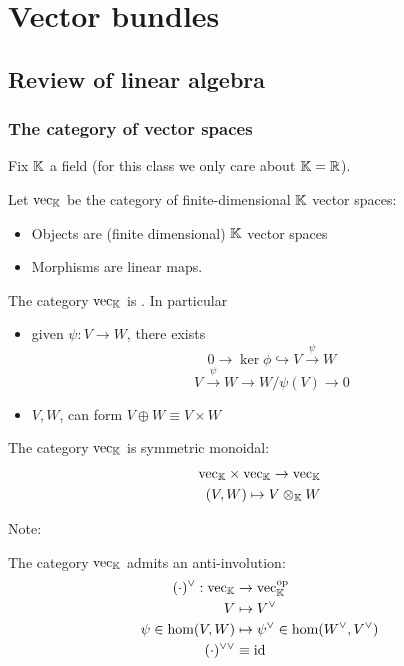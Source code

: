 \chapter{Vector bundles}

\section{Review of linear algebra}

\subsection{The category of vector spaces}

Fix \(\mathbb{K}\) a field (for this class we only care about \(\mathbb{K}=\mathbb{R}\)).

Let \(\text{vec}_{\mathbb{K}}\) be the category of finite-dimensional \(\mathbb{K}\) vector spaces:
\begin{itemize}
    \item Objects are (finite dimensional) \(\mathbb{K}\) vector spaces 
    \item Morphisms are linear maps.
\end{itemize}

The category \(\text{vec}_{\mathbb{K}}\) is . In particular 
\begin{itemize}
    \item given \(\psi:V\to W\), there exists \[0\to \ker \phi \hookrightarrow V\stackrel{\psi}{\to} W\]
         \[V\stackrel{\psi}{\to} W\to W/\psi(V)\to 0\] %
    \item \(V,W\), can form \(V\oplus W \equiv V\times W\) 
\end{itemize}

The category \(\text{vec}_{\mathbb{K}}\) is symmetric monoidal:
\begin{align*}
    \text{vec}_{\mathbb{K}} \times \text{vec}_{\mathbb{K}} \to \text{vec}_{\mathbb{K}}\\
    (V,W)\mapsto V \otimes_{\mathbb{K}} W
\end{align*}

Note: %

The category \(\text{vec}_{\mathbb{K}}\) admits an anti-involution:
\begin{align*}
    (\cdot)^{\vee}:\text{vec}_{\mathbb{K}}&\to \text{vec}_{\mathbb{K}}^{\text{op}}\\
    V&\mapsto V^\vee \\
    \psi\in\text{hom}(V,W)&\mapsto \psi^\vee \in \text{hom}(W^\vee,V^\vee) \\
    (\cdot)^{\vee\vee} & \equiv \text{id}
\end{align*}

